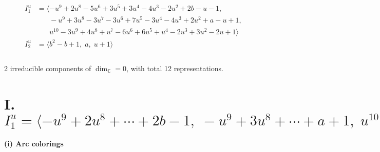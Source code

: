 \documentclass[1p]{elsarticle_modified}
\theoremstyle{definition}
\begin{document}
\begin{align*}
I^u_{1}&=\langle 
- u^9+2 u^8-5 u^6+3 u^5+3 u^4-4 u^3-2 u^2+2 b- u-1,\\
\phantom{I^u_{1}}&\phantom{= \langle  }- u^9+3 u^8-3 u^7-3 u^6+7 u^5-3 u^4-4 u^3+2 u^2+a- u+1,\\
\phantom{I^u_{1}}&\phantom{= \langle  }u^{10}-3 u^9+4 u^8+u^7-6 u^6+6 u^5+u^4-2 u^3+3 u^2-2 u+1\rangle \\
I^u_{2}&=\langle 
b^2- b+1,\;a,\;u+1\rangle \\
\\
\end{align*}
\raggedright * 2 irreducible components of $\dim_{\mathbb{C}}=0$, with total 12 representations.\\
\newpage
\renewcommand{\arraystretch}{1}
\centering \section*{I. $I^u_{1}= \langle - u^9+2 u^8+\cdots+2 b-1,\;- u^9+3 u^8+\cdots+a+1,\;u^{10}-3 u^9+\cdots-2 u+1 \rangle$}
\flushleft \textbf{(i) Arc colorings}\\
\end{document}
